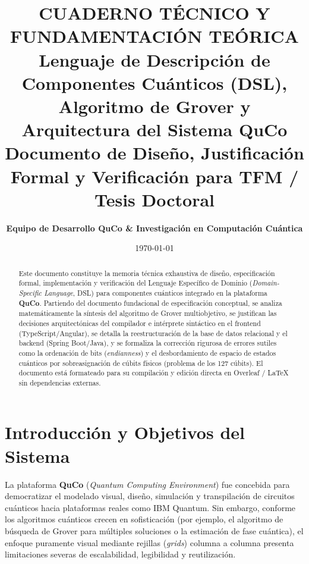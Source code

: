 \documentclass[11pt,a4paper]{article}
\title{
    \vspace{-1.5cm}
    \textbf{\Large CUADERNO TÉCNICO Y FUNDAMENTACIÓN TEÓRICA}\\[0.3cm]
    \textbf{\LARGE Lenguaje de Descripción de Componentes Cuánticos (DSL), Algoritmo de Grover y Arquitectura del Sistema QuCo}\\[0.4cm]
    \large Documento de Diseño, Justificación Formal y Verificación para TFM / Tesis Doctoral
}
\author{\textbf{Equipo de Desarrollo QuCo \& Investigación en Computación Cuántica}}
\date{\today}
\begin{document}
\maketitle

\begin{abstract}
Este documento constituye la memoria técnica exhaustiva de diseño, especificación formal, implementación y verificación del Lenguaje Específico de Dominio (\textit{Domain-Specific Language}, DSL) para componentes cuánticos integrado en la plataforma \textbf{QuCo}. Partiendo del documento fundacional de especificación conceptual, se analiza matemáticamente la síntesis del algoritmo de Grover multiobjetivo, se justifican las decisiones arquitectónicas del compilador e intérprete sintáctico en el frontend (TypeScript/Angular), se detalla la reestructuración de la base de datos relacional y el backend (Spring Boot/Java), y se formaliza la corrección rigurosa de errores sutiles como la ordenación de bits (\textit{endianness}) y el desbordamiento de espacio de estados cuánticos por sobreasignación de cúbits físicos (problema de los 127 cúbits). El documento está formateado para su compilación y edición directa en Overleaf / LaTeX sin dependencias externas.
\end{abstract}

\tableofcontents
\newpage

\section{Introducción y Objetivos del Sistema}

La plataforma \textbf{QuCo} (\textit{Quantum Computing Environment}) fue concebida para democratizar el modelado visual, diseño, simulación y transpilación de circuitos cuánticos hacia plataformas reales como IBM Quantum. Sin embargo, conforme los algoritmos cuánticos crecen en sofisticación (por ejemplo, el algoritmo de búsqueda de Grover para múltiples soluciones o la estimación de fase cuántica), el enfoque puramente visual mediante rejillas (\textit{grids}) columna a columna presenta limitaciones severas de escalabilidad, legibilidad y reutilización.
\end{document}
